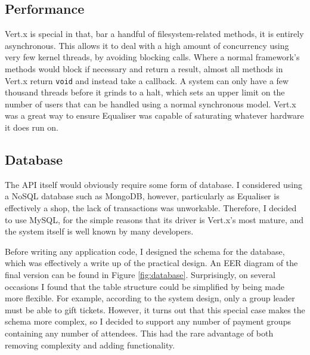\documentclass[12pt,a4paper]{bhamdissertation}
\newcommand{\code}[1]{\texttt{#1}}
\begin{document}
\subsection{Performance}

Vert.x is special in that, bar a handful of filesystem-related methods, it is entirely asynchronous. This allows it to deal with a high amount of concurrency using very few kernel threads, by avoiding blocking calls. Where a normal framework's methods would block if necessary and return a result, almost all methods in Vert.x return \code{void} and instead take a callback. A system can only have a few thousand threads before it grinds to a halt, which sets an upper limit on the number of users that can be handled using a normal synchronous model. Vert.x was a great way to ensure Equaliser was capable of saturating whatever hardware it does run on.

\subsection{Database}

The API itself would obviously require some form of database. I considered using a NoSQL database such as MongoDB, however, particularly as Equaliser is effectively a shop, the lack of transactions was unworkable. Therefore, I decided to use MySQL, for the simple reasons that its driver is Vert.x's most mature, and the system itself is well known by many developers.

Before writing any application code, I designed the schema for the database, which was effectively a write up of the practical design. An EER diagram of the final version can be found in Figure \ref{fig:database}. Surprisingly, on several occasions I found that the table structure could be simplified by being made more flexible. For example, according to the system design, only a group leader must be able to gift tickets. However, it turns out that this special case makes the schema more complex, so I decided to support any number of payment groups containing any number of attendees. This had the rare advantage of both removing complexity and adding functionality.
\end{document}
